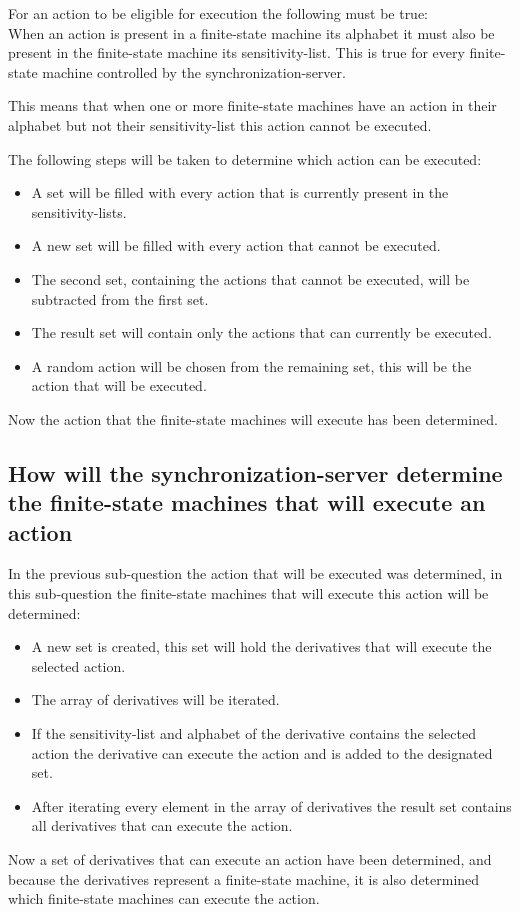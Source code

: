For an action to be eligible for execution the following must be true:\\
When an action is present in a finite-state machine its alphabet it must
also be present in the finite-state machine its sensitivity-list. This
is true for every finite-state machine controlled by the
synchronization-server.

This means that when one or more finite-state machines have an action in
their alphabet but not their sensitivity-list this action cannot be
executed.

The following steps will be taken to determine which action can be
executed:

\begin{itemize}
\tightlist
\item
  A set will be filled with every action that is currently present in
  the sensitivity-lists.
\item
  A new set will be filled with every action that cannot be executed.
\item
  The second set, containing the actions that cannot be executed, will
  be subtracted from the first set.
\item
  The result set will contain only the actions that can currently be
  executed.
\item
  A random action will be chosen from the remaining set, this will be
  the action that will be executed.
\end{itemize}

Now the action that the finite-state machines will execute has been
determined.

\hypertarget{how-will-the-synchronization-server-determine-the-finite-state-machines-that-will-execute-an-action}{%
\subsection{How will the synchronization-server determine the
finite-state machines that will execute an
action}\label{how-will-the-synchronization-server-determine-the-finite-state-machines-that-will-execute-an-action}}

In the previous sub-question the action that will be executed was
determined, in this sub-question the finite-state machines that will
execute this action will be determined:

\begin{itemize}
\tightlist
\item
  A new set is created, this set will hold the derivatives that will
  execute the selected action.
\item
  The array of derivatives will be iterated.
\item
  If the sensitivity-list and alphabet of the derivative contains the
  selected action the derivative can execute the action and is added to
  the designated set.
\item
  After iterating every element in the array of derivatives the result
  set contains all derivatives that can execute the action.
\end{itemize}

Now a set of derivatives that can execute an action have been
determined, and because the derivatives represent a finite-state
machine, it is also determined which finite-state machines can execute
the action.
